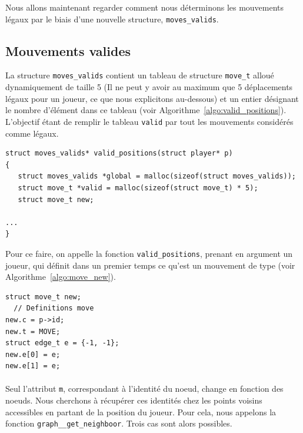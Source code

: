 \documentclass[a4paper]{article}
\begin{document}
Nous allons maintenant regarder comment nous déterminons les mouvements légaux par le biais d'une nouvelle structure, \texttt{moves\_valids}.

\subsection{Mouvements valides}

La structure \texttt{moves\_valids} contient un tableau de structure \texttt{move\_t} alloué dynamiquement de taille 5 (Il ne peut y avoir au maximum que 5 déplacements légaux pour un joueur, ce que nous explicitons au-dessous) et un entier désignant le nombre d'élément dans ce tableau (voir Algorithme~\ref{algo:valid_positions}). L'objectif étant de remplir le tableau \texttt{valid} par tout les mouvements considérés comme légaux. \\

\begin{lstlisting}[caption = {Entête de la fonction définissant les mouvements possibles}, label = {algo:valid_positions}, float = h]
struct moves_valids* valid_positions(struct player* p)
{
   struct moves_valids *global = malloc(sizeof(struct moves_valids)); 
   struct move_t *valid = malloc(sizeof(struct move_t) * 5);
   struct move_t new; 
  
...
}
\end{lstlisting}

Pour ce faire, on appelle la fonction \texttt{valid\_positions}, prenant en argument un joueur, qui définit dans un premier temps ce qu'est un mouvement de type  (voir Algorithme~\ref{algo:move_new}). \\

\begin{lstlisting}[caption = {Définition d'un mouvement}, label = {algo:move_new}]
struct move_t new; 
  // Definitions move
new.c = p->id; 
new.t = MOVE; 
struct edge_t e = {-1, -1};
new.e[0] = e;
new.e[1] = e;  
\end{lstlisting}
\paragraph{}
Seul l'attribut \texttt{m}, correspondant à l'identité du noeud, change en fonction des noeuds. Nous cherchons à récupérer ces identités chez les points voisins accessibles en partant de la position du joueur. Pour cela, nous appelons la fonction \texttt{graph\_\_get\_neighboor}. Trois cas sont alors possibles. \\
\end{document}
